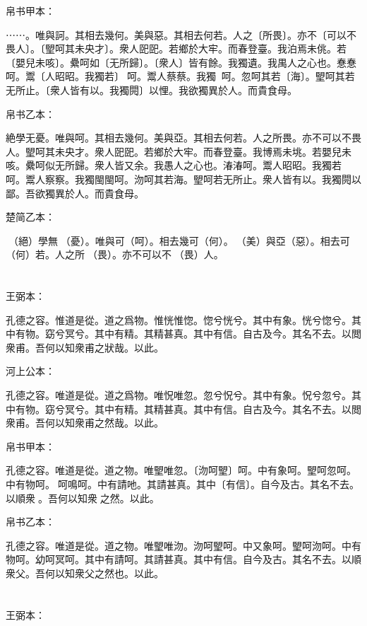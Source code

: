 \documentclass[a5paper]{ctexbook}
\begin{document}
    帛书甲本：

    ⋯⋯。唯與訶。其相去幾何。美與惡。其相去何若。人之〔所畏〕。亦不〔可以不畏人〕。〔朢呵其未央才〕。衆人巸巸。若鄉於大牢。而春登臺。我泊焉未佻。若〔嬰兒未咳〕。纍呵如〔无所歸〕。〔衆人〕皆有餘。我獨遺。我禺人之心也。惷惷呵。鬻〔人昭昭。我獨若〕󱁝呵。鬻人蔡蔡。我獨𨴽𨴽呵。忽呵其若〔海〕。朢呵其若无所止。〔衆人皆有以。我獨䦎〕以悝。我欲獨異於人。而貴食母。

    帛书乙本：

    絶學无憂。唯與呵。其相去幾何。美與亞。其相去何若。人之所畏。亦不可以不畏人。朢呵其未央才。衆人巸巸。若鄉於大牢。而春登臺。我博焉未垗。若嬰兒未咳。纍呵似无所歸。衆人皆又余。我愚人之心也。湷湷呵。鬻人昭昭。我獨若𨴽呵。鬻人察察。我獨閩閩呵。沕呵其若海。朢呵若无所止。衆人皆有以。我獨䦎以鄙。吾欲獨異於人。而貴食母。

    楚简乙本：

    󶴐（絕）學無𢝊（憂）。唯與可（呵）。相去幾可（何）。𡵂（美）與亞（惡）。相去可（何）若。人之所𥚸（畏）。亦不可以不𥚸（畏）人。

    \chapter{}
    王弼本：

    孔德之容。惟道是從。道之爲物。惟恍惟惚。惚兮恍兮。其中有象。恍兮惚兮。其中有物。窈兮冥兮。其中有精。其精甚真。其中有信。自古及今。其名不去。以閲衆甫。吾何以知衆甫之狀哉。以此。

    河上公本：

    孔德之容。唯道是從。道之爲物。唯怳唯忽。忽兮怳兮。其中有象。怳兮忽兮。其中有物。窈兮冥兮。其中有精。其精甚真。其中有信。自古及今。其名不去。以閲衆甫。吾何以知衆甫之然哉。以此。

    帛书甲本：

    孔德之容。唯道是從。道之物。唯朢唯忽。〔沕呵朢〕呵。中有象呵。朢呵忽呵。中有物呵。𣾧呵鳴呵。中有請吔。其請甚真。其中〔有信〕。自今及古。其名不去。以順衆𠇑。吾何以知衆𠇑之然。以此。

    帛书乙本：

    孔德之容。唯道是從。道之物。唯朢唯沕。沕呵朢呵。中又象呵。朢呵沕呵。中有物呵。幼呵冥呵。其中有請呵。其請甚真。其中有信。自今及古。其名不去。以順衆父。吾何以知衆父之然也。以此。

    \chapter{}
    王弼本：
\end{document}
